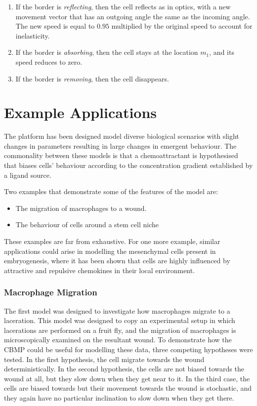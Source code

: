 \documentclass[12pt]{article}
\begin{document}
\begin{enumerate}
  \item If the border is {\itshape reflecting}, then the cell reflects as in optics, 
with a new movement vector that has an outgoing angle the same as the 
incoming angle. The new speed is equal to \(0.95\) multiplied by the original speed
to account for inelasticity.
\item If the border is {\itshape absorbing}, then the cell stays at the location \(m_1\), 
  and its speed reduces to zero.
\item If the border is {\itshape removing}, then the cell disappears.
\end{enumerate}

\section{Example Applications}
The platform has been designed model diverse biological scenarios with 
slight changes in parameters resulting in large changes in emergent 
behaviour. The commonality between these models is that a 
chemoattractant is hypothesised that biases cells' behaviour according 
to the concentration gradient established by a ligand source.

Two examples that demonstrate some of the features of the model are:

\begin{itemize}
\item The migration of macrophages to a wound.
\item The behaviour of cells around a stem cell niche
\end{itemize}

These examples are far from exhaustive. For one more example, similar 
applications could arise in modelling the mesenchymal cells present in 
embryogenesis,\cite{caplan91} where it has been shown that cells are highly influenced 
by attractive and repulsive chemokines in their local environment.

\subsubsection{Macrophage Migration}
The first model was designed to investigate how macrophages migrate to a 
laceration. This model was designed to copy an experimental setup in 
which lacerations are performed on a fruit fly, and the migration of 
macrophages is microscopically examined on the resultant wound. To 
demonstrate how the CBMP could be useful for modelling these data, three 
competing hypotheses were tested. In the first hypothesis, the cell 
migrate towards the wound deterministically. In the second hypothesis, 
the cells are not biased towards the wound at all, but they slow down 
when they get near to it. In the third case, the cells are biased 
towards but their movement towards the wound is stochastic, and they 
again have no particular inclination to slow down when they get there.
\end{document}
